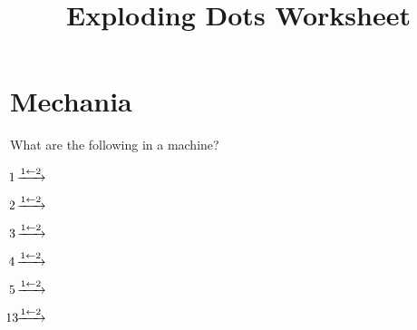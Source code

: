 \documentclass[letterpaper,12pt]{article}
\title{Exploding Dots Worksheet}
\author{}
\date{}
\begin{document}
	\maketitle
	\section{Mechania}
		What are the following in a  machine?

		\begin{minipage}{0.5\textwidth}
			\begin{minipage}{0.2\textwidth}
				$\mathmakebox[0.1cm]{1} \xrightarrow{\mach{2}{1}}$
			\end{minipage}
			\begin{minipage}{0.8\textwidth}
			\end{minipage}

			\begin{minipage}{0.2\textwidth}
				$\mathmakebox[0.1cm]{2} \xrightarrow{\mach{2}{1}}$
			\end{minipage}
			\begin{minipage}{0.8\textwidth}
			\end{minipage}

			\begin{minipage}{0.2\textwidth}
				$\mathmakebox[0.1cm]{3} \xrightarrow{\mach{2}{1}}$
			\end{minipage}
			\begin{minipage}{0.8\textwidth}
			\end{minipage}
		\end{minipage}
		\begin{minipage}{0.5\textwidth}
			\begin{minipage}{0.2\textwidth}
				$\mathmakebox[0.1cm]{4} \xrightarrow{\mach{2}{1}}$
			\end{minipage}
			\begin{minipage}{0.8\textwidth}
			\end{minipage}
			\begin{minipage}{0.2\textwidth}
				$\mathmakebox[0.1cm]{5} \xrightarrow{\mach{2}{1}}$
			\end{minipage}
			\begin{minipage}{0.8\textwidth}
			\end{minipage}
			\begin{minipage}{0.2\textwidth}
				$\mathmakebox[0.1cm]{13} \xrightarrow{\mach{2}{1}}$
			\end{minipage}
			\begin{minipage}{0.8\textwidth}
			\end{minipage}
		\end{minipage}
\end{document}
